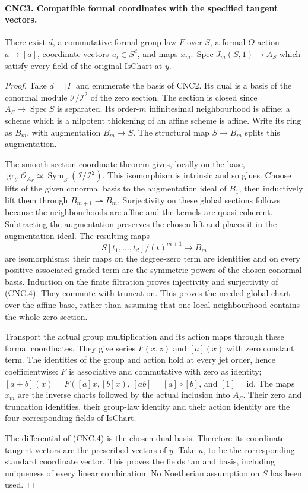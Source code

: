\documentclass[11pt,a4paper]{article}
\numberwithin{equation}{section}
\theoremstyle{remark}\newtheorem{remark}[theorem]{Remark}
\begin{document}
\paragraph{CNC3. Compatible formal coordinates with the specified tangent vectors.}
\label{claim:CNC3}
There exist \(d\), a commutative formal group law \(F\) over \(S\),
a formal \(O\)-action \(a\mapsto[a]\), coordinate vectors
\(u_\iota\in S^d\), and maps
\(x_m:\operatorname{Spec}J_m(S,1)\to A_S\) which satisfy every
field of the original \(\mathrm{IsChart}\) at \(y\).
\begin{proof}
Take \(d=|I|\) and enumerate the basis of CNC2.  Its dual is a basis
of the conormal module \(\mathcal I/\mathcal I^2\) of the zero
section.  The section is closed since \(A_S\to\operatorname{Spec}S\)
is separated.  Its order-\(m\) infinitesimal neighbourhood is affine:
a scheme which is a nilpotent thickening of an affine scheme is affine.
Write its ring as \(B_m\), with augmentation \(B_m\to S\).
The structural map \(S\to B_m\) splits this augmentation.

The smooth-section coordinate theorem gives, locally on the base,
\(\operatorname{gr}_{\mathcal I}\mathcal O_{A_S}
 \simeq\operatorname{Sym}_S(\mathcal I/\mathcal I^2)\).
This isomorphism is intrinsic and so glues.  Choose lifts of the given
conormal basis to the augmentation ideal of \(B_1\), then inductively
lift them through \(B_{m+1}\twoheadrightarrow B_m\).
Surjectivity on these global sections follows because the neighbourhoods
are affine and the kernels are quasi-coherent.  Subtracting the
augmentation preserves the chosen lift and places it in the augmentation
ideal.  The resulting maps
\[
 S[t_1,\ldots,t_d]/(t)^{m+1}\longrightarrow B_m              \tag{CNC.4}
\]
are isomorphisms: their maps on the degree-zero term are identities and
on every positive associated graded term are the symmetric powers of
the chosen conormal basis.  Induction on the finite filtration proves
injectivity and surjectivity of (CNC.4).  They commute with truncation.
This proves the needed global chart over the affine base, rather than
assuming that one local neighbourhood contains the whole zero section.

Transport the actual group multiplication and its action maps through
these formal coordinates.  They give series \(F(x,z)\) and \([a](x)\)
with zero constant term.  The identities of the group and action hold
at every jet order, hence coefficientwise: \(F\) is associative and
commutative with zero as identity; \([a+b](x)=F([a]x,[b]x)\),
\([ab]=[a]\circ[b]\), and \([1]=\mathrm{id}\).
The maps \(x_m\) are the inverse charts followed by the actual
inclusion into \(A_S\).  Their zero and truncation identities, their
group-law identity and their action identity are the four corresponding
fields of \(\mathrm{IsChart}\).

The differential of (CNC.4) is the chosen dual basis.  Therefore its
coordinate tangent vectors are the prescribed vectors of \(y\).
Take \(u_\iota\) to be the corresponding standard coordinate vector.
This proves the fields \(\mathrm{tan}\) and \(\mathrm{basis}\),
including uniqueness of every linear combination.  No Noetherian
assumption on \(S\) has been used.
\end{proof}
\end{document}
